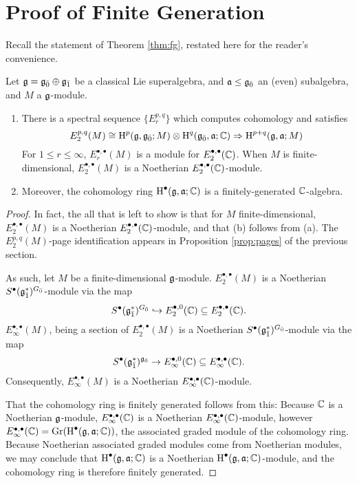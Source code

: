 \section{Proof of Finite Generation}
\label{sec:fg-proof}

Recall the statement of Theorem \ref{thm:fg}, restated here for the reader's convenience.

\begin{maintheorem}
  Let $\mathfrak{g} = {\mathfrak{g}}_{\bar{0}} \oplus {\mathfrak{g}}_{\bar{1}}$ be a classical Lie superalgebra, and $\mathfrak{a} \leq {\mathfrak{g}}_{\bar{0}}$ an (even) subalgebra, and $M$ a $\mathfrak{g}$-module.
  \begin{enumerate}[\indent\rm (a)]
    \item There is a spectral sequence $\{E_r^{p,q}\}$ which computes cohomology and satisfies
  \[
    E_2^{p,q}(M) \cong \operatorname{H}^p(\mathfrak{g},{\mathfrak{g}}_{\bar{0}};M) \otimes \operatorname{H}^q({\mathfrak{g}}_{\bar{0}},\mathfrak{a};\mathbb{C}) \Rightarrow \operatorname{H}^{p+q}(\mathfrak{g},\mathfrak{a};M)
  \]
  For $1 \leq r \leq \infty$, $E_r^{\bullet,\bullet}(M)$ is a module for $E_2^{\bullet,\bullet}(\mathbb{C})$. When $M$ is finite-dimensional, $E_2^{\bullet,\bullet}(M)$ is a Noetherian $E_2^{\bullet,\bullet}(\mathbb{C})$-module.
    \item Moreover, the cohomology ring $\operatorname{H}^\bullet(\mathfrak{g},\mathfrak{a};\mathbb{C})$ is a finitely-generated $\mathbb{C}$-algebra.
  \end{enumerate}
\end{maintheorem}

\begin{proof}
  In fact, the all that is left to show is that for $M$ finite-dimensional, $E_2^{\bullet,\bullet}(M)$ is a Noetherian $E_2^{\bullet,\bullet}(\mathbb{C})$-module, and that (b) follows from (a). The $E_2^{p,q}(M)$-page identification appears in Proposition \ref{prop:pages} of the previous section.

    As such, let $M$ be a finite-dimensional $\mathfrak{g}$-module. $E_2^{\bullet,\bullet}(M)$ is a Noetherian $S^\bullet({\mathfrak{g}}_{\bar{1}}^*)^{{G}_{\bar{0}}}$-module via the map
  \[
    S^\bullet({\mathfrak{g}}_{\bar{1}}^*)^{{G}_{\bar{0}}} \hookrightarrow E_2^{\bullet,0}(\mathbb{C}) \subseteq E_2^{\bullet,\bullet}(\mathbb{C}).
  \]
  $E_\infty^{\bullet,\bullet}(M)$, being a section of $E_2^{\bullet,\bullet}(M)$ is a Noetherian $S^\bullet({\mathfrak{g}}_{\bar{1}}^*)^{{G}_{\bar{0}}}$-module via the map
  \[
    S^\bullet({\mathfrak{g}}_{\bar{1}}^*)^{{\mathfrak{g}}_{\bar{0}}} \to E_\infty^{\bullet,0}(\mathbb{C}) \subseteq E_\infty^{\bullet,\bullet}(\mathbb{C}).
  \]
  Consequently, $E_\infty^{\bullet,\bullet}(M)$ is a Noetherian $E_\infty^{\bullet,\bullet}(\mathbb{C})$-module.

That the cohomology ring is finitely generated follows from this: Because $\mathbb{C}$ is a Noetherian $\mathfrak{g}$-module,  $E_\infty^{\bullet,\bullet}(\mathbb{C})$ is a Noetherian $E_\infty^{\bullet,\bullet}(\mathbb{C})$-module, however $E_\infty^{\bullet,\bullet}(\mathbb{C}) = \operatorname{Gr}(\operatorname{H}^\bullet(\mathfrak{g},\mathfrak{a};\mathbb{C}))$, the associated graded module of the cohomology ring. Because Noetherian associated graded modules come from Noetherian modules, we may conclude that $\operatorname{H}^\bullet(\mathfrak{g},\mathfrak{a};\mathbb{C})$ is a Noetherian $\operatorname{H}^\bullet(\mathfrak{g},\mathfrak{a};\mathbb{C})$-module, and the cohomology ring is therefore finitely generated.
\end{proof}

